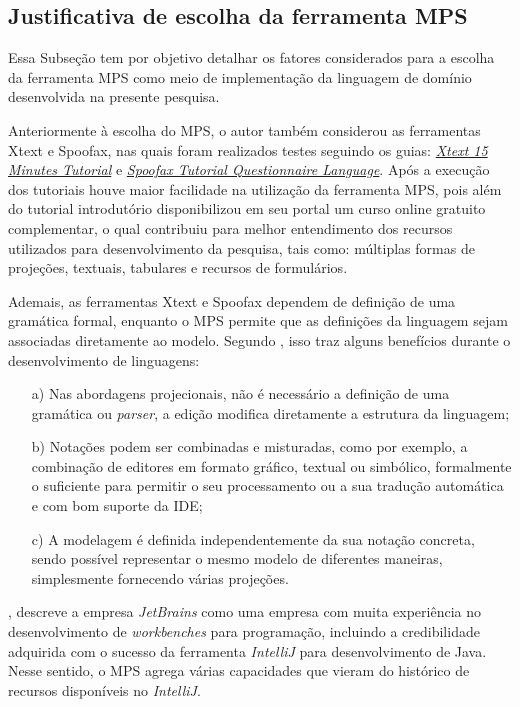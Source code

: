 
\subsection{Justificativa de escolha da ferramenta MPS}
\label{justificativamps}

Essa Subseção tem por objetivo detalhar os fatores considerados para a escolha da ferramenta \gls{MPS} como meio de implementação da linguagem de domínio desenvolvida na presente pesquisa.

Anteriormente à escolha do \gls{MPS}, o autor também considerou  as ferramentas Xtext e Spoofax, nas quais foram realizados testes seguindo os guias: \textit{\href{https://www.eclipse.org/Xtext/documentation/103_domainmodelnextsteps.html}{Xtext 15 Minutes Tutorial}} e \textit{\href{http://metaborg.github.io/spoofax/tutorials/ql/}{Spoofax Tutorial Questionnaire Language}}. Após a execução dos tutoriais houve maior facilidade na utilização da ferramenta MPS, pois além do tutorial introdutório disponibilizou em seu portal um curso online gratuito complementar, o qual contribuiu para melhor entendimento dos recursos utilizados para desenvolvimento da pesquisa, tais como: múltiplas formas de projeções, textuais, tabulares e recursos de formulários. 


Ademais, as ferramentas Xtext e Spoofax dependem de definição de uma gramática formal, enquanto o MPS permite que as definições da linguagem sejam associadas diretamente ao modelo. Segundo , isso traz alguns benefícios durante o desenvolvimento de linguagens: 
\begin{enumerate}
    \item[a)] Nas abordagens projecionais, não é necessário a definição de uma gramática ou \textit{parser}, a edição modifica diretamente a estrutura da linguagem;
    \item[b)] Notações podem ser combinadas e misturadas, como por exemplo, a combinação de editores em formato gráfico, textual ou simbólico, formalmente o suficiente para permitir o seu processamento ou a sua tradução automática e com bom suporte da IDE;
    \item[c)] A modelagem é definida independentemente da sua notação concreta, sendo possível representar o mesmo modelo de diferentes maneiras, simplesmente fornecendo várias projeções.
    
\end{enumerate}

, descreve a empresa \textit{JetBrains} como uma empresa com muita experiência no desenvolvimento de \textit{workbenches} para programação, incluindo a credibilidade adquirida com o sucesso da ferramenta \textit{IntelliJ} para desenvolvimento de Java.  Nesse sentido, o \gls{MPS} agrega várias capacidades que vieram do histórico de recursos disponíveis no \textit{IntelliJ}. 

